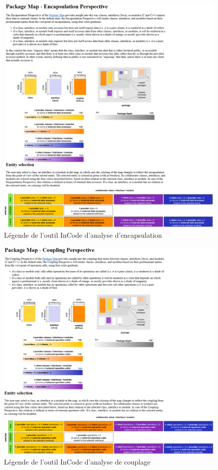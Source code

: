 \documentclass[12pt,a4paper,final]{article}
\begin{document}
\begin{figure}[ht]
	\centering
	\includegraphics[width=\textwidth]{images/InCodeEncapsulationLegende.png}
	\caption{\label{encapsulationLeg}Légende de l'outil InCode d'analyse d'encapsulation}
\end{figure}

\begin{figure}[ht]
	\centering
	\includegraphics[width=\textwidth]{images/InCodeCouplingLegende.png}
	\caption{\label{couplingLeg}Légende de l'outil InCode d'analyse de couplage}
\end{figure}
\end{document}
